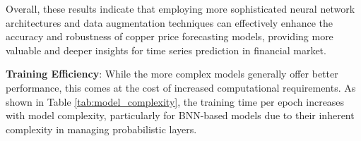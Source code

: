 \documentclass[final-report]{report-template}
\begin{document}
Overall, these results indicate that employing more sophisticated neural network architectures and data augmentation techniques can effectively enhance the accuracy and robustness of copper price forecasting models, providing more valuable and deeper insights for time series prediction in financial market.
\begin{table}[h]
\centering
\caption{Model Complexity Comparison}
\label{tab:model_complexity}
\end{table}
\textbf{Training Efficiency}: While the more complex models generally offer better performance, this comes at the cost of increased computational requirements. As shown in Table \autoref{tab:model_complexity}, the training time per epoch increases with model complexity, particularly for BNN-based models due to their inherent complexity in managing probabilistic layers.
\end{document}
